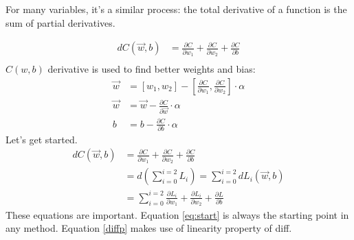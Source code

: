 For many variables, it's a similar process: the total derivative of a function is the sum of partial derivatives.

\begin{align}
  dC(\vec{w},b) &= \frac{\partial C}{\partial w_1}+ \frac{\partial C}{\partial w_2} + \frac{\partial C}{\partial b}\\
\end{align}
$C(w,b)$ derivative is used to find better weights and bias:
\begin{align*}
  \vec{w} &= [w_1, w_2] - [\frac{\partial C}{\partial w_1},\frac{\partial C}{\partial w_2}]\cdot{}\alpha\\
  \vec{w} &= \vec{w} -\frac{\partial C}{\partial \vec{w}}\cdot{}\alpha\\
  b &= b -\frac{\partial C}{\partial b}\cdot{}\alpha
\end{align*}
Let's get started.
\begin{align}
  dC(\vec{w},b) &= \frac{\partial C}{\partial w_1}+ \frac{\partial C}{\partial w_2} + \frac{\partial C}{\partial b}\label{eq:start}\\
  &= d(\sum_{i=0}^{i=2}L_i) = \sum_{i=0}^{i=2}dL_i(\vec{w},b) \label{diffp}\\
  &=\sum_{i=0}^{i=2} \frac{\partial L_i}{\partial w_1} +\frac{\partial L_i}{\partial w_2} + \frac{\partial L}{\partial b}\nonumber
\end{align} 
These equations are important. Equation \ref{eq:start} is always the starting point in any method. Equation \ref{diffp} makes use of linearity property of diff.

